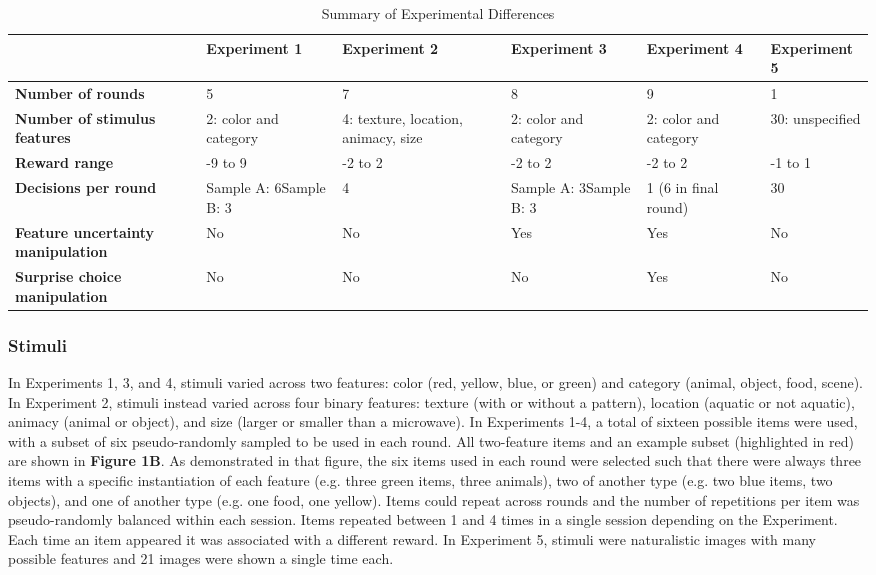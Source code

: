 \documentclass[10pt,letterpaper]{article}
\begin{document}
\begin{table}[h]
\centering
\begin{tabular}{p{3cm}p{2.5cm}p{2.5cm}p{2.5cm}p{2.5cm}p{2.5cm}}
\hline
 & \textbf{Experiment 1} & \textbf{Experiment 2} & \textbf{Experiment 3} & \textbf{Experiment 4} & \textbf{Experiment 5} \\
\hline
\textbf{Number of rounds} & 5 & 7 & 8 & 9 & 1\\
\hline
\textbf{Number of stimulus features} & 2: color and category & 4: texture, location, animacy, size & 2: color and category & 2: color and category & 30: unspecified \\
\hline
\textbf{Reward range} & -9 to 9 & -2 to 2 & -2 to 2 & -2 to 2 & -1 to 1\\
\hline
\textbf{Decisions per round} & Sample A: 6\newline Sample B: 3 & 4 & Sample A: 3\newline Sample B: 3 & 1 (6 in final round) & 30\\
\hline
\textbf{Feature uncertainty manipulation }& No & No & Yes & Yes & No\\
\hline
\textbf{Surprise choice manipulation} & No & No & No & Yes & No\\
\hline
\end{tabular}
\caption{Summary of Experimental Differences}
\label{tab:exp_differences}
\end{table}

\subsubsection{Stimuli}

In Experiments 1, 3, and 4, stimuli varied across two features: color (red, yellow, blue, or green) and category (animal, object, food, scene). In Experiment 2, stimuli instead varied across four binary features: texture (with or without a pattern), location (aquatic or not aquatic), animacy (animal or object), and size (larger or smaller than a microwave). In Experiments 1-4, a total of sixteen possible items were used, with a subset of six pseudo-randomly sampled to be used in each round. All two-feature items and an example subset (highlighted in red) are shown in \textbf{Figure 1B}. As demonstrated in that figure, the six items used in each round were selected such that there were always three items with a specific instantiation of each feature (e.g. three green items, three animals), two of another type (e.g. two blue items, two objects), and one of another type (e.g. one food, one yellow). Items could repeat across rounds and the number of repetitions per item was pseudo-randomly balanced within each session. Items repeated between 1 and 4 times in a single session depending on the Experiment. Each time an item appeared it was associated with a different reward. In Experiment 5, stimuli were naturalistic images with many possible features and 21 images were shown a single time each.
\end{document}

